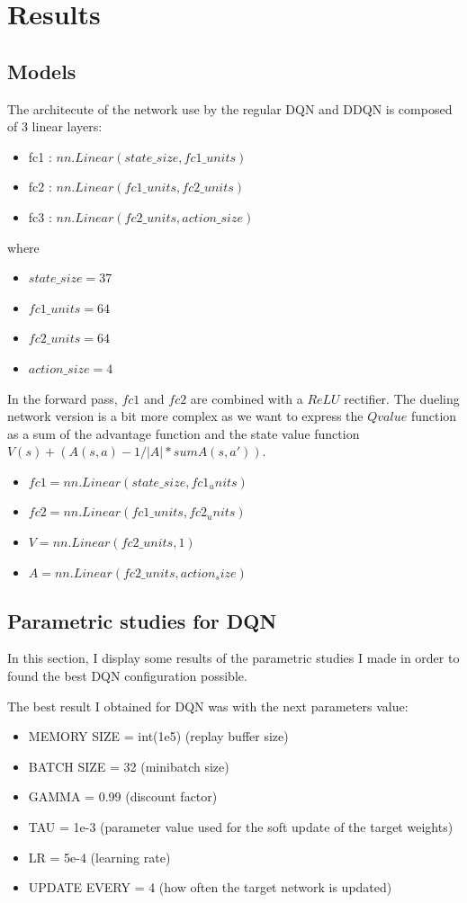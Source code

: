 \documentclass[12pt]{article}
\begin{document}
\section{Results} 
\subsection{Models}
The architecute of the network use by the regular DQN and DDQN is composed of 3 linear layers:

\begin{itemize}
\item fc1 : $nn.Linear(state\_size, fc1\_units)$
\item fc2 : $nn.Linear(fc1\_units, fc2\_units)$
\item fc3 : $nn.Linear(fc2\_units, action\_size)$
\end{itemize}
 
where 

\begin{itemize}
\item $state\_size=37$
\item $fc1\_units=64$
\item $fc2\_units=64$
\item $action\_size=4$
\end{itemize}

In the forward pass, $fc1$ and $fc2$ are combined with a $ReLU$ rectifier.
The dueling network version is a bit more complex as we want to express the $Q value$ function as a sum of the advantage function and the state value function $V(s) + (A(s,a) - 1/|A| * sum A(s,a'))$.

\begin{itemize}
\item $fc1 = nn.Linear(state\_size, fc1_units)$
\item $fc2 = nn.Linear(fc1\_units, fc2_units)$
\item $V = nn.Linear(fc2\_units, 1)$
\item $A = nn.Linear(fc2\_units, action_size)$
\end{itemize}


\subsection{Parametric studies for DQN}
In this section, I display some results of the parametric studies I made in order to found the best DQN configuration possible. 

The best result I obtained for DQN was with the next parameters value:
\begin{itemize}
\item MEMORY SIZE = int(1e5) (replay buffer size)
\item BATCH SIZE = 32  (minibatch size)
\item GAMMA = 0.99  (discount factor)
\item TAU = 1e-3  (parameter value used for the soft update of the target weights)
\item LR = 5e-4  (learning rate)
\item UPDATE EVERY = 4  (how often the target network is updated)
\end{itemize}
\end{document}
